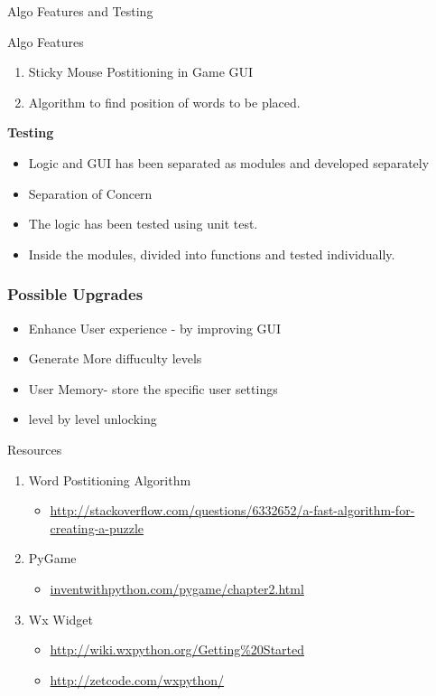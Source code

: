 \documentclass{beamer}
\begin{document}
\begin{frame}{Algo Features and Testing}
\begin{block}{Algo Features}
\begin{enumerate}
\item  Sticky Mouse Postitioning in Game GUI
\item Algorithm to find position of words to be placed. 
\end{enumerate}
\textbf{Testing}
\begin{itemize}
\item Logic and GUI has been separated as modules and developed separately
\item Separation of Concern
\item The logic has been tested using unit test.
\item Inside the modules, divided into functions and tested individually.
\end{itemize}


\end{block}


\end{frame}



\begin{frame}
\frametitle{Possible Upgrades}

\begin{itemize}
\item Enhance User experience - by improving GUI
\item Generate More diffuculty levels
\item User Memory- store the specific user settings 
\item level by level unlocking
\end{itemize}

\end{frame}


\begin{frame}{Resources}
\begin{enumerate}

\item Word Postitioning Algorithm
\begin{itemize}[]
\item \url{http://stackoverflow.com/questions/6332652/a-fast-algorithm-for-creating-a-puzzle}
\end{itemize}

\item PyGame  
\begin{itemize}[]
\item \url{inventwithpython.com/pygame/chapter2.html}

\end{itemize}

\item Wx Widget
\begin{itemize}[]
\item \url{http://wiki.wxpython.org/Getting\%20Started}
\item \url{http://zetcode.com/wxpython/}
\end{itemize}

\end{enumerate}

\end{frame}
% 
\end{document}
